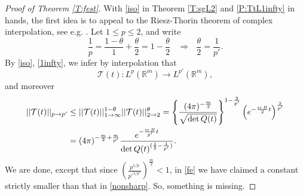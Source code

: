 \documentclass[11pt,a4paper]{amsart}
\newcommand{\Rm}{\mathbb R^m}
\numberwithin{equation}{section}
\newcommand{\tr}{\operatorname{tr}}
\numberwithin{equation}{section}
\begin{document}
\begin{proof}[Proof of Theorem \ref{T:fest}]
With \eqref{iso} in Theorem \ref{T:sgL2} and \ref{P:TtL1infty} in hands, the first idea is to appeal to the Riesz-Thorin theorem of complex interpolation, see e.g. \cite[Theorem 1.3, p. 179]{SW}. Let $1\le p\le 2$, and write 
\[
\frac 1p = \frac{1-\theta}1 + \frac{\theta}2 = 1 - \frac{\theta}2\ \ \ \ \Longrightarrow\ \ \  \frac{\theta}2 = \frac{1}{p'}.
\] 
By \eqref{iso}, \eqref{1infty}, we infer by interpolation that
\[
\mathcal T(t) : L^p(\Rm) \to L^{p'}(\Rm),
\]
and moreover
\begin{align}\label{nonsharp}
||\mathcal T(t)||_{p\to p'} & \le ||\mathcal T(t)||_{1\to \infty}^{1-\theta} ||\mathcal T(t)||_{2\to 2}^{\theta} = \left\{\frac{(4\pi 
)^{-\frac{m}{2}}}{\sqrt{\det Q(t)}}\right\}^{1-\frac{2}{p'}} \left(e^{-\frac{\tr B}2 t }\right)^{\frac{2}{p'}} 
\\
& = (4\pi
)^{-\frac{m}{2}+\frac{m}{p'}} \frac{e^{-\frac{\tr B}{p'} t}}{\det Q(t)^{(\frac 12 - \frac 1{p'})}}.
\notag
\end{align}
We are done, except that since $\left(\frac{p^{1/p}}{{p'}^{1/p'}}\right)^{\frac m2}<1$, in \eqref{fe} we have claimed a constant strictly smaller than that in \eqref{nonsharp}. So, something is missing.


\end{proof}
\end{document}
